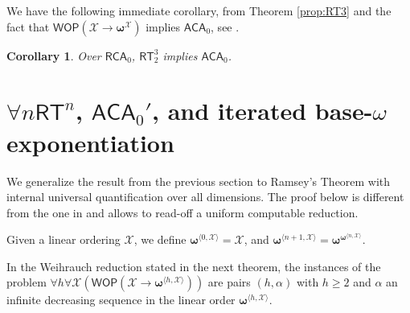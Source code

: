 \documentclass{amsart}
\newcommand\Nat{\mathbb{N}}
\newcommand\RCA{\mathsf{RCA}}
\newcommand\ACA{\mathsf{ACA}}
\newcommand\RT{\mathsf{RT}}
\newcommand\WOP{\mathsf{WOP}}
\newcommand{\LoX}{\mathcal{X}}
\newcommand\boldomega{\pmb{\omega}}
\newtheorem{proposition}{Proposition}
\newtheorem{corollary}{Corollary}
\begin{document}
We have the following immediate corollary, from Theorem \ref{prop:RT3} and the fact that $\WOP(\LoX \to \boldomega^\LoX)$ implies $\ACA_0$, see \cite{Gir:87, Hir:94}.

\begin{corollary}
Over $\RCA_0$, $\RT^3_2$ implies $\ACA_0$.
\end{corollary}

\section{$\forall n \RT^n$, $\ACA_0'$, and iterated base-$\omega$ exponentiation}

We generalize the result from the previous section to Ramsey's Theorem with internal universal quantification 
over all dimensions. The proof below is different from the one in \cite{Car:12} and allows to read-off a uniform computable reduction.

Given a linear ordering $\LoX$, we define $\boldomega^{\langle 0, \LoX\rangle} = \LoX$, and $\boldomega^{\langle n+1,\LoX\rangle}=\boldomega^{\boldomega^{\langle n, \LoX\rangle}}$.

In the Weihrauch reduction stated in the next theorem, the instances of the problem 
$\forall h \forall \LoX (\WOP(\LoX \rightarrow \boldomega^{\langle h,\LoX \rangle}))$ are pairs $(h,\alpha)$ 
with $h\geq 2$ and $\alpha$ an infinite decreasing sequence in the linear order $\boldomega^{\langle h, \LoX\rangle}$.
\end{document}

